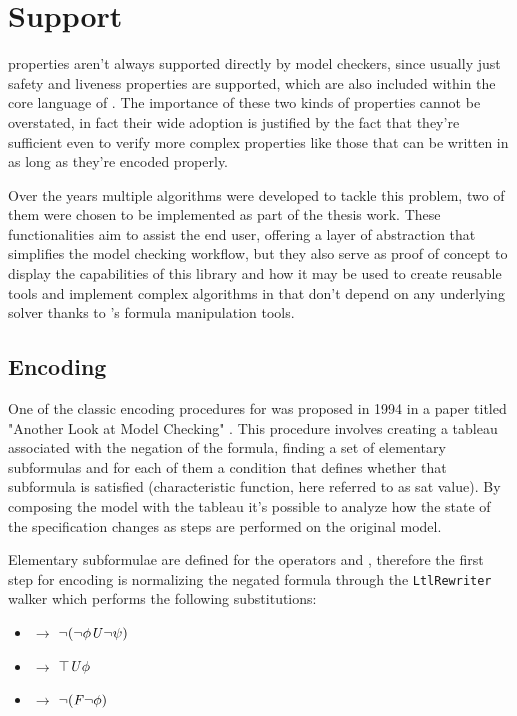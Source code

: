 \chapter{\ltl{} Support}
\ltl{} properties aren't always supported directly by model checkers, since usually just safety and liveness properties are supported, which are also included within the core language of \vmtlib{}.
The importance of these two kinds of properties cannot be overstated, in fact their wide adoption is justified by the fact that they're sufficient even to verify more complex properties like those that can be written in \LTL{} as long as they're encoded properly.

Over the years multiple algorithms were developed to tackle this problem, two of them were chosen to be implemented as part of the thesis work.
These functionalities aim to assist the end user, offering a layer of abstraction that simplifies the model checking workflow, but they also serve as proof of concept to display the capabilities of this library and how it may be used to create reusable tools and implement complex algorithms in \python{} that don't depend on any underlying solver thanks to \pysmt{}'s formula manipulation tools.

\section{\ltltosmv{} Encoding}
One of the classic encoding procedures for \ltl{} was proposed in 1994 in a paper titled "Another Look at \ltl{} Model Checking" \cite{DBLP:conf/cav/ClarkeGH94}.
This procedure involves creating a tableau associated with the negation of the \ltl{} formula, finding a set of elementary subformulas and for each of them a condition that defines whether that subformula is satisfied (characteristic function, here referred to as sat value).
By composing the model with the tableau it's possible to analyze how the state of the \ltl{} specification changes as steps are performed on the original model.

Elementary subformulae are defined for the \ltl{} operators \fX{} and \fU{}, therefore the first step for encoding is normalizing the negated formula through the \texttt{LtlRewriter} walker which performs the following substitutions:
\begin{itemize}
    \item \fR{} $\longrightarrow{}$ $\lnot(\lnot \phi \mathit{U} \lnot \psi)$
    \item \fF{} $\longrightarrow{}$ $\top \mathit{U} \phi$
    \item \fG{} $\longrightarrow{}$ $\lnot (\mathit{F} \lnot \phi)$
\end{itemize}

